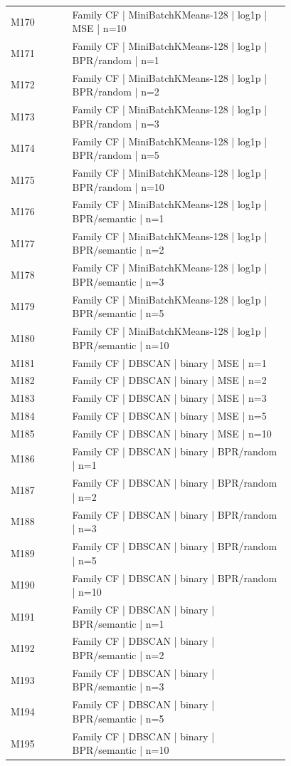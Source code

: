 \begin{longtable}{lp{0.78\linewidth}}
M170 & Family CF | MiniBatchKMeans-128 | log1p | MSE | n=10 \\
M171 & Family CF | MiniBatchKMeans-128 | log1p | BPR/random | n=1 \\
M172 & Family CF | MiniBatchKMeans-128 | log1p | BPR/random | n=2 \\
M173 & Family CF | MiniBatchKMeans-128 | log1p | BPR/random | n=3 \\
M174 & Family CF | MiniBatchKMeans-128 | log1p | BPR/random | n=5 \\
M175 & Family CF | MiniBatchKMeans-128 | log1p | BPR/random | n=10 \\
M176 & Family CF | MiniBatchKMeans-128 | log1p | BPR/semantic | n=1 \\
M177 & Family CF | MiniBatchKMeans-128 | log1p | BPR/semantic | n=2 \\
M178 & Family CF | MiniBatchKMeans-128 | log1p | BPR/semantic | n=3 \\
M179 & Family CF | MiniBatchKMeans-128 | log1p | BPR/semantic | n=5 \\
M180 & Family CF | MiniBatchKMeans-128 | log1p | BPR/semantic | n=10 \\
M181 & Family CF | DBSCAN | binary | MSE | n=1 \\
M182 & Family CF | DBSCAN | binary | MSE | n=2 \\
M183 & Family CF | DBSCAN | binary | MSE | n=3 \\
M184 & Family CF | DBSCAN | binary | MSE | n=5 \\
M185 & Family CF | DBSCAN | binary | MSE | n=10 \\
M186 & Family CF | DBSCAN | binary | BPR/random | n=1 \\
M187 & Family CF | DBSCAN | binary | BPR/random | n=2 \\
M188 & Family CF | DBSCAN | binary | BPR/random | n=3 \\
M189 & Family CF | DBSCAN | binary | BPR/random | n=5 \\
M190 & Family CF | DBSCAN | binary | BPR/random | n=10 \\
M191 & Family CF | DBSCAN | binary | BPR/semantic | n=1 \\
M192 & Family CF | DBSCAN | binary | BPR/semantic | n=2 \\
M193 & Family CF | DBSCAN | binary | BPR/semantic | n=3 \\
M194 & Family CF | DBSCAN | binary | BPR/semantic | n=5 \\
M195 & Family CF | DBSCAN | binary | BPR/semantic | n=10 \\

\end{longtable}
